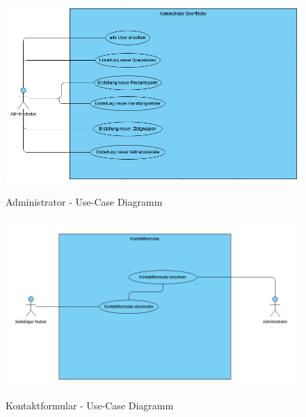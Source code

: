 \clearpage
\pagebreak

\label{Anhang-Use-Cases}

\label{Anhang-Admin}
\begin{figure}[h]
    \centering
    \begin{minipage}[t]{1\textwidth}
        \caption{Administrator - Use-Case Diagramm}
        \includegraphics[width=1\textwidth]{img/admin-use-case.png}\\
    \end{minipage}
\end{figure}

\label{Anhang-Kontakt}
\begin{figure}[h]
    \centering
    \begin{minipage}[t]{1\textwidth}
        \caption{Kontaktformular - Use-Case Diagramm}
        \includegraphics[width=1\textwidth]{img/kontakt-use-case.png}\\
    \end{minipage}
\end{figure}

